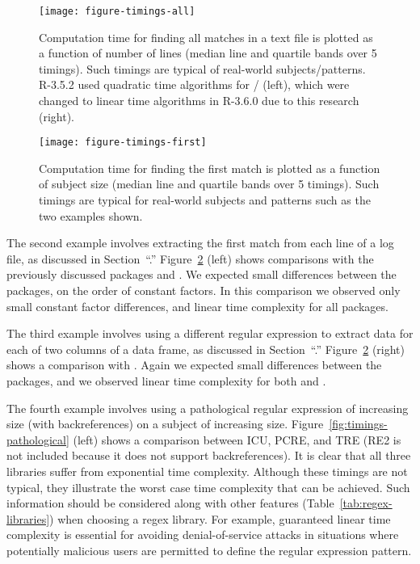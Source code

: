 \begin{figure}
  \texttt{[image: figure-timings-all]}
  \vskip -0.5cm
  \caption{\label{fig:timings-all} Computation time for finding
    all matches in a text file is plotted as a function of number of lines (median line and quartile bands over 5 timings). Such timings
    are typical of real-world subjects/patterns. R-3.5.2 used
    quadratic time algorithms for /
    (left), which were changed to linear time algorithms in R-3.6.0
    due to this research (right).}
\end{figure}

\begin{figure}
  \texttt{[image: figure-timings-first]}
  \vskip -0.5cm
  \caption{\label{fig:timings-first} Computation time for finding the first match is plotted as
    a function of subject size (median line and quartile bands over 5
    timings). Such timings are typical for real-world subjects and patterns such as the two examples shown. }
\end{figure}

The second example involves extracting the first match from each line
of a log file, as discussed in Section~``\sectionrex.''
Figure~\ref{fig:timings-first} (left) shows comparisons with the
previously discussed packages and . We expected
small differences between the packages, on the order of constant
factors. In this comparison we observed only small constant factor
differences, and linear time complexity for all packages.

The third example involves using a different regular expression to
extract data for each of two columns of a data frame, as discussed in
Section~``\sectiontidyr.'' Figure~\ref{fig:timings-first} (right)
shows a comparison with . Again we expected small
differences between the packages, and we observed linear time
complexity for both  and .

The fourth example involves using a pathological regular expression of
increasing size (with backreferences) on a subject of increasing size.
Figure~\ref{fig:timings-pathological} (left) shows a comparison
between ICU, PCRE, and TRE (RE2 is not included because it does not
support backreferences). It is clear that all three libraries suffer
from exponential time complexity.
Although these timings are not typical, they illustrate
the worst case time complexity that can be achieved. Such information
should be considered along with other features
(Table~\ref{tab:regex-libraries}) when choosing a regex library. For
example, guaranteed linear time complexity is essential for avoiding
denial-of-service attacks in situations where potentially malicious
users are permitted to define the regular expression pattern.

